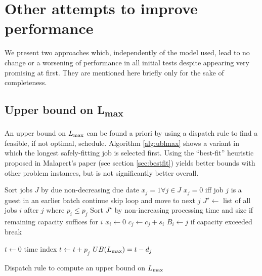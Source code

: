 \documentclass[13pt, letterpaper, oneside]{book}
\begin{document}
\section{Other attempts to improve performance}
We present two approaches which, independently of the model used, lead to no change
or a worsening of performance in all initial tests despite appearing very
promising at first. They are mentioned here briefly only for the sake of
completeness.

\subsection[Upper bound on $\Lmax$]{Upper bound on {\sansitalicfont L}\textsubscript{max}}
\label{sec:ublmax}
An upper bound on $\Lmax$ can be found a priori by using a dispatch rule to find a
feasible, if not optimal, schedule. Algorithm \ref{alg:ublmax} shows a variant
in which the longest safely-fitting job is selected first. Using the ``best-fit''
heuristic proposed in Malapert's paper (see section \ref{sec:bestfit}) yields
better bounds with other problem instances, but is not significantly better
overall. 

\begin{algorithm}[h]
\fontsize{9pt}{11.5pt}\selectfont
\begin{algorithmic}
\State Sort jobs $J$ by due non-decreasing due date
\State $x_j = 1 \forall j \in J$  \Comment $x_j = 0$ iff job $j$ is a guest in an earlier batch
      \State continue \Comment skip loop and move to next $j$
  \EndIf
  \State $J^\star \gets$ list of all jobs $i$ after $j$ where $p_i \leq p_j$
  \State Sort $J^\star$ by non-increasing processing time and size
     \Comment if remaining capacity suffices for $i$
      \State $x_i \gets 0$
      \State $c_j \gets c_j + s_i$
      \State $B_i \gets j$
    \EndIf
     \Comment if capacity exceeded
      \State break
    \EndIf

\State $t \gets 0$ \Comment time index
    \State $t \gets t + p_j$
      \State $UB(L_{\text{max}}) = t - d_j$
    \EndIf
  \EndIf
{}
\end{algorithmic}
\caption{Dispatch rule to compute an upper bound on $\Lmax$}
\label{alg:ublmax}
\end{algorithm}
\end{document}
